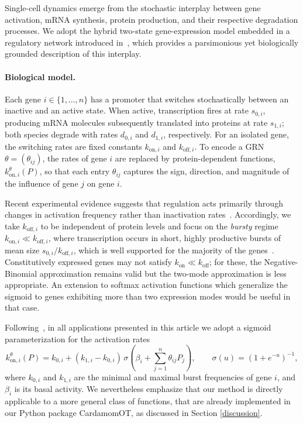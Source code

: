 \documentclass[a4paper, 11pt]{article}
\theoremstyle{plain}
\theoremstyle{remark}
\newcommand*{\firstreview}[1]{{\color{black}#1}}
\begin{document}
Single-cell dynamics emerge from the stochastic interplay between gene activation, mRNA synthesis, protein production, \firstreview{and their respective degradation processes.} We adopt the hybrid two-state gene-expression model embedded in a regulatory network introduced in~\cite{herbachinferring2017}, which provides a parsimonious yet biologically grounded description of this interplay.

\paragraph{Biological model.}
Each gene $i \in \{1,\dots,n\}$ has a promoter that switches stochastically between an inactive and an active state. When active, transcription fires at rate $s_{0,i}$, producing mRNA molecules subsequently translated into proteins at rate $s_{1,i}$; both species degrade with rates $d_{0,i}$ and $d_{1,i}$, respectively. For an isolated gene, the switching rates are fixed constants $k_{\mathrm{on},i}$ and $k_{\mathrm{off},i}$. To encode a GRN $\theta = (\theta_{ij})$, the rates of gene $i$ are replaced by protein-dependent functions, $k^{\theta}_{\mathrm{on},i}(P)$, so that each entry $\theta_{ij}$ captures the sign, direction, and magnitude of the influence of gene $j$ on gene $i$.

Recent experimental evidence suggests that regulation acts primarily through changes in activation frequency rather than inactivation rates~\cite{li2011central,RN6412}. Accordingly, we take $k_{\mathrm{off},i}$ to be independent of protein levels and focus on the \emph{bursty} regime $k_{\mathrm{on},i} \ll k_{\mathrm{off},i}$, where transcription occurs in short, highly productive bursts of mean size $s_{0,i}/k_{\mathrm{off},i}$\firstreview{, which is well supported for the majority of the genes~\cite{suter2011mammalian, RN6412}. Constitutively expressed genes may not
satisfy $k_{\mathrm{on}} \ll k_{\mathrm{off}}$; for these, the Negative-Binomial approximation remains
valid but the two-mode approximation is less appropriate. An extension to softmax activation functions which generalize the sigmoid to genes exhibiting more than two expression modes would be useful in that case.}

 Following~\cite{herbach2018modelisation,ventre2023one}, in all applications presented in this article we adopt a sigmoid parameterization for the activation rates
\begin{equation}
\label{kon_function}
k^{\theta}_{\mathrm{on},i}(P)
= k_{0,i} + (k_{1,i}-k_{0,i}) \,\sigma\!\left(\beta_i + \sum_{j=1}^n \theta_{ij} P_j\right),
\qquad
\sigma(u) = \left(1 + e^{-u}\right)^{-1},
\end{equation}
where $k_{0,i}$ and $k_{1,i}$ are the minimal and maximal burst frequencies of gene $i$, and $\beta_i$ is its basal activity. We nevertheless emphasize that our method is directly applicable to a more general class of functions, that are already implemented in our Python package CardamomOT, as discussed in Section \ref{discussion}.
\end{document}
